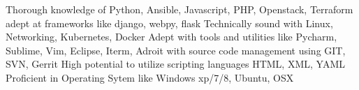 
\begin{cvskills}
  \cvskill
    {Thorough knowledge of }
    {Python, Ansible, Javascript, PHP, Openstack, Terraform}
  \cvskill
    {adept at frameworks like}
    {django, webpy, flask}
  \cvskill
    {Technically sound with}
    {Linux, Networking, Kubernetes, Docker}
  \cvskill
    {Adept with tools and utilities like}
    {Pycharm, Sublime, Vim, Eclipse, Iterm, }
  \cvskill
    {Adroit with source code management using}
    {GIT, SVN, Gerrit}
  \cvskill
    {High potential to utilize scripting languages}
    {HTML, XML, YAML}
  \cvskill
  {Proficient in Operating Sytem like}
  {Windows xp/7/8, Ubuntu, OSX}
\end{cvskills}